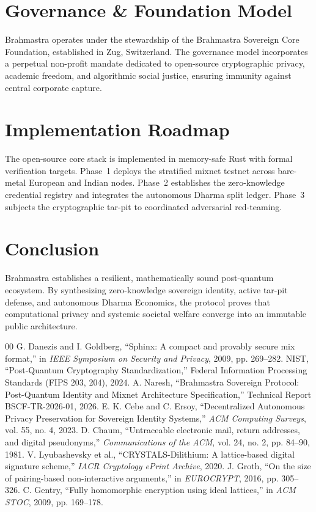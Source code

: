 \documentclass[conference,leqno]{IEEEtran}
\begin{document}
\section{Governance \& Foundation Model}
Brahmastra operates under the stewardship of the Brahmastra Sovereign Core Foundation, established in Zug, Switzerland. The governance model incorporates a perpetual non-profit mandate dedicated to open-source cryptographic privacy, academic freedom, and algorithmic social justice, ensuring immunity against central corporate capture.

\section{Implementation Roadmap}
The open-source core stack is implemented in memory-safe Rust with formal verification targets. Phase~1 deploys the stratified mixnet testnet across bare-metal European and Indian nodes. Phase~2 establishes the zero-knowledge credential registry and integrates the autonomous Dharma split ledger. Phase~3 subjects the cryptographic tar-pit to coordinated adversarial red-teaming.

\section{Conclusion}
Brahmastra establishes a resilient, mathematically sound post-quantum ecosystem. By synthesizing zero-knowledge sovereign identity, active tar-pit defense, and autonomous Dharma Economics, the protocol proves that computational privacy and systemic societal welfare converge into an immutable public architecture.

\begin{thebibliography}{00}
 G. Danezis and I. Goldberg, ``Sphinx: A compact and provably secure mix format,'' in \textit{IEEE Symposium on Security and Privacy}, 2009, pp. 269--282.
 NIST, ``Post-Quantum Cryptography Standardization,'' Federal Information Processing Standards (FIPS 203, 204), 2024.
 A. Naresh, ``Brahmastra Sovereign Protocol: Post-Quantum Identity and Mixnet Architecture Specification,'' Technical Report BSCF-TR-2026-01, 2026.
 E. K. Cebe and C. Ersoy, ``Decentralized Autonomous Privacy Preservation for Sovereign Identity Systems,'' \textit{ACM Computing Surveys}, vol. 55, no. 4, 2023.
 D. Chaum, ``Untraceable electronic mail, return addresses, and digital pseudonyms,'' \textit{Communications of the ACM}, vol. 24, no. 2, pp. 84--90, 1981.
 V. Lyubashevsky et al., ``CRYSTALS-Dilithium: A lattice-based digital signature scheme,'' \textit{IACR Cryptology ePrint Archive}, 2020.
 J. Groth, ``On the size of pairing-based non-interactive arguments,'' in \textit{EUROCRYPT}, 2016, pp. 305--326.
 C. Gentry, ``Fully homomorphic encryption using ideal lattices,'' in \textit{ACM STOC}, 2009, pp. 169--178.
\end{thebibliography}
\end{document}
